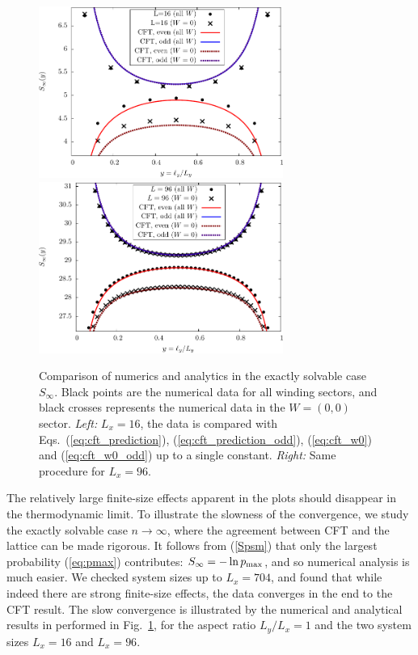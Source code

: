 \documentclass[11pt]{iopart}
\begin{document}
\begin{figure}[ht]
 \begin{center}
  \includegraphics[width=8cm]{./figures/sinfty_16.pdf}
  \includegraphics[width=8cm]{./figures/sinfty_96.pdf}
 \end{center}
\caption{Comparison of numerics and analytics in the exactly solvable case $S_\infty$. Black points are the numerical data for all winding sectors, and black crosses represents the numerical data in the $W=(0,0)$ sector. \emph{Left:} $L_x=16$, the data is compared with Eqs.~(\ref{eq:cft_prediction}), (\ref{eq:cft_prediction_odd}),  (\ref{eq:cft_w0}) and (\ref{eq:cft_w0_odd}) up to a single constant. \emph{Right:} Same procedure for $L_x=96$. }
\label{fig:Sinfty}
\end{figure}
The relatively large finite-size effects apparent in the plots should disappear in the thermodynamic limit.  To illustrate the slowness of the convergence, we study the exactly solvable case $n\to\infty$, where the agreement between CFT and the lattice can be made rigorous. 
It follows from (\ref{Spsm}) that only the largest probability (\ref{eq:pmax}) contributes: $S_\infty=-\ln p_{\rm max}$, and so numerical analysis is much easier. We checked system sizes up to $L_x=704$, and found that while indeed there are strong finite-size effects, the data converges in the end to the CFT result. 
The slow convergence is illustrated by the numerical and analytical results in performed in Fig.~\ref{fig:Sinfty}, for the aspect ratio $L_y/L_x=1$ and the two system sizes $L_x=16$ and $L_x=96$. 
\end{document}
